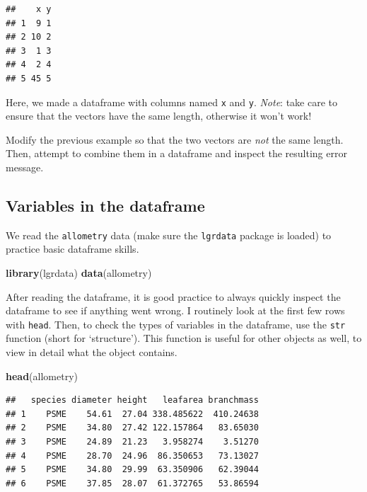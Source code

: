 \documentclass[]{book}
\newenvironment{Shaded}{\begin{snugshade}}{\end{snugshade}}
\newcommand{\KeywordTok}[1]{\textcolor[rgb]{0.13,0.29,0.53}{\textbf{#1}}}
\newcommand{\NormalTok}[1]{#1}
\let\BeginKnitrBlock\begin \let\EndKnitrBlock\end
\begin{document}
\begin{verbatim}
##    x y
## 1  9 1
## 2 10 2
## 3  1 3
## 4  2 4
## 5 45 5
\end{verbatim}

Here, we made a dataframe with columns named \texttt{x} and \texttt{y}. \emph{Note}: take care to ensure that the vectors have the same length, otherwise it won't work!

\BeginKnitrBlock{rmdtry}
Modify the previous example so that the two vectors are \emph{not} the same length. Then, attempt to combine them in a dataframe and inspect the resulting error message.
\EndKnitrBlock{rmdtry}

\hypertarget{vecdataframes}{%
\subsection{Variables in the dataframe}\label{vecdataframes}}

We read the \texttt{allometry} data (make sure the \texttt{lgrdata} package is loaded) to practice basic dataframe skills.

\begin{Shaded}
\begin{Highlighting}[]
\KeywordTok{library}\NormalTok{(lgrdata)}
\KeywordTok{data}\NormalTok{(allometry)}
\end{Highlighting}
\end{Shaded}

After reading the dataframe, it is good practice to always quickly inspect the dataframe to see if anything went wrong. I routinely look at the first few rows with \texttt{head}. Then, to check the types of variables in the dataframe, use the \texttt{str} function (short for `structure'). This function is useful for other objects as well, to view in detail what the object contains.

\begin{Shaded}
\begin{Highlighting}[]
\KeywordTok{head}\NormalTok{(allometry)}
\end{Highlighting}
\end{Shaded}

\begin{verbatim}
##   species diameter height   leafarea branchmass
## 1    PSME    54.61  27.04 338.485622  410.24638
## 2    PSME    34.80  27.42 122.157864   83.65030
## 3    PSME    24.89  21.23   3.958274    3.51270
## 4    PSME    28.70  24.96  86.350653   73.13027
## 5    PSME    34.80  29.99  63.350906   62.39044
## 6    PSME    37.85  28.07  61.372765   53.86594
\end{verbatim}
\end{document}

